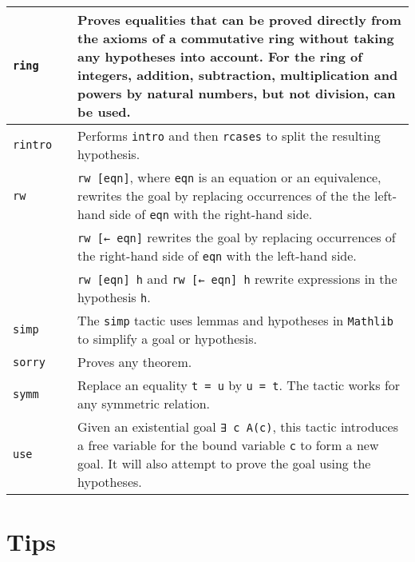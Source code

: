 \begin{tabular}{p{}|r|p{}}
\hline

\Verb+ring+&\pageref{p.ring}&Proves equalities that can be proved directly from the axioms of a commutative ring without taking any hypotheses into account. For the ring of integers, addition, subtraction, multiplication and powers by natural numbers, but not division, can be used.\\\hline

\Verb+rintro+&\pageref{p.rintro}&Performs \Verb+intro+ and then \Verb+rcases+ to split the resulting hypothesis.\\\hline

\Verb+rw+&\pageref{p.rw}&\Verb+rw [eqn]+, where \Verb+eqn+ is an equation or an equivalence, rewrites the goal by replacing occurrences of the the left-hand side of \Verb+eqn+ with the right-hand side.\\
&&\Verb+rw [← eqn]+ rewrites the goal by replacing occurrences of the right-hand side of \Verb+eqn+ with the left-hand side.\\
&&\Verb+rw [eqn] h+ and \Verb+rw [← eqn] h+ rewrite expressions in the hypothesis \Verb+h+.\\\hline

\Verb+simp+&\pageref{p.simp}&The \Verb+simp+ tactic uses lemmas and hypotheses in \Verb+Mathlib+ to simplify a goal or hypothesis.\\\hline

\Verb+sorry+&\pageref{p.sorry}&Proves any theorem.\\\hline

\Verb+symm+&\pageref{p.symm}&Replace an equality \Verb+t = u+ by \Verb+u = t+. The tactic works for any symmetric relation.\\\hline

\Verb+use+&\pageref{p.use}&Given an existential goal \Verb+∃ c A(c)+, this tactic introduces a free variable for the bound variable \Verb+c+ to form a new goal. It will also attempt to prove the goal using the hypotheses.\\\hline

\end{tabular}

\newpage

\section{Tips}

